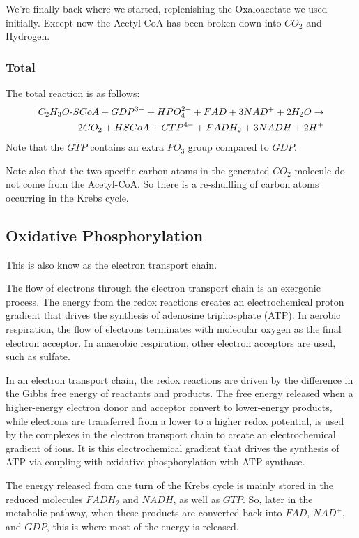 \documentclass{article}
\def\mhyphen{{\hbox{-}}}
\begin{document}
We're finally back where we started, replenishing the Oxaloacetate we used initially.
Except now the Acetyl-CoA has been broken down into $CO_2$ and Hydrogen.

\subsubsection{Total}
The total reaction is as follows:
\[
    \begin{split}
    C_2H_3O{\mhyphen}SCoA + GDP^{3-}+ HPO_4^{2-} + FAD + 3NAD^+ + 2H_2O \rightarrow \\
    2CO_2 + HSCoA + GTP^{4-} + FADH_2 + 3NADH + 2H^+
    \end{split}
\]
Note that the $GTP$ contains an extra $PO_3$ group compared to $GDP$.

Note also that the two specific carbon atoms in the generated $CO_2$ molecule do not come
from the Acetyl-CoA. So there is a re-shuffling of carbon atoms occurring in the Krebs
cycle.

\subsection{Oxidative Phosphorylation}
This is also know as the electron transport chain.

The flow of electrons through the electron transport chain is an exergonic process. The
energy from the redox reactions creates an electrochemical proton gradient that drives the
synthesis of adenosine triphosphate (ATP). In aerobic respiration, the flow of electrons
terminates with molecular oxygen as the final electron acceptor. In anaerobic respiration,
other electron acceptors are used, such as sulfate.

In an electron transport chain, the redox reactions are driven by the difference in the
Gibbs free energy of reactants and products. The free energy released when a higher-energy
electron donor and acceptor convert to lower-energy products, while electrons are
transferred from a lower to a higher redox potential, is used by the complexes in the
electron transport chain to create an electrochemical gradient of ions. It is this
electrochemical gradient that drives the synthesis of ATP via coupling with oxidative
phosphorylation with ATP synthase.

The energy released from one turn of the Krebs cycle is mainly stored in the reduced
molecules $FADH_2$ and $NADH$, as well as $GTP$. So, later in the metabolic pathway, when
these products are converted back into $FAD$, $NAD^+$, and $GDP$, this is where most of
the energy is released.
\end{document}

